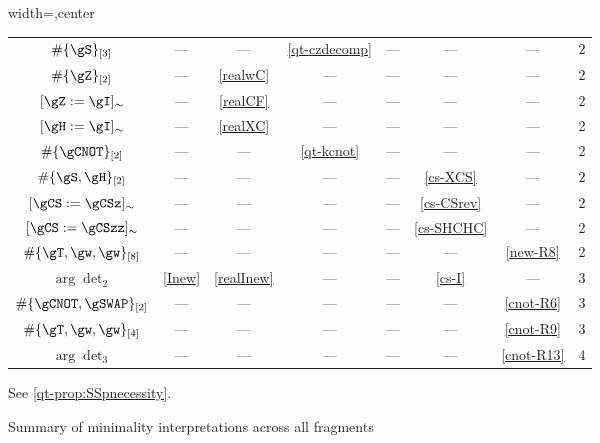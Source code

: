 \begin{figure}[ht]
\begin{threeparttable}
\begin{adjustbox}{width=\textwidth,center}
\begin{tabular}{|c|c|c|c|c|c|c|c|}
    $\#\{\gS\}_{[3]}$ & — & — & \eqref{qt-czdecomp} & — & — & — & 2 \\
    $\#\{\gZ\}_{[2]}$ & — & \eqref{realwC} & — & — & — & — & 2 \\
    $[\gZ:=\gI]_{\sim}$ & — & \eqref{realCF} & — & — & — & — & 2 \\
    $[\gH:=\gI]_{\sim}$ & — & \eqref{realXC} & — & — & — & — & 2 \\
    $\#\{\gCNOT\}_{[2]}$ & — & — & \eqref{qt-kcnot} & — & — & — & 2 \\
    $\#\{\gS,\gH\}_{[2]}$ & — & — & — & — & \eqref{cs-XCS} & — & 2 \\
    $[\gCS:=\gCSz]_{\sim}$ & — & — & — & — & \eqref{cs-CSrev} & — & 2 \\
    $[\gCS:=\gCSzz]_{\sim}$ & — & — & — & — & \eqref{cs-SHCHC} & — & 2 \\
    $\#\{\gT,\gw,\gw\}_{[8]}$ & — & — & — & — & — & \eqref{new-R8} & 2 \\
    \hline
    $\arg\det_{2}$ & \eqref{Inew} & \eqref{realInew} & — & — & \eqref{cs-I} & — & 3 \\
    $\#\{\gCNOT,\gSWAP\}_{[2]}$ & — & —  & — & — & — & \eqref{cnot-R6} & 3 \\
    $\#\{\gT,\gw,\gw\}_{[4]}$ & — & — & — & — & — & \eqref{cnot-R9} & 3 \\
    \hline
    $\arg\det_{3}$ & — & — & — & — & — & \eqref{cnot-R13} & 4 \\
    \hline
    \end{tabular}
    \end{adjustbox}
    \begin{tablenotes}
    \footnotesize
    \item[a] See \cref{qt-prop:SSpnecessity}.
    \end{tablenotes}
    \end{threeparttable}
  \caption{Summary of minimality interpretations across all fragments}
  \label{fig:minimality-summary}
\end{figure}
